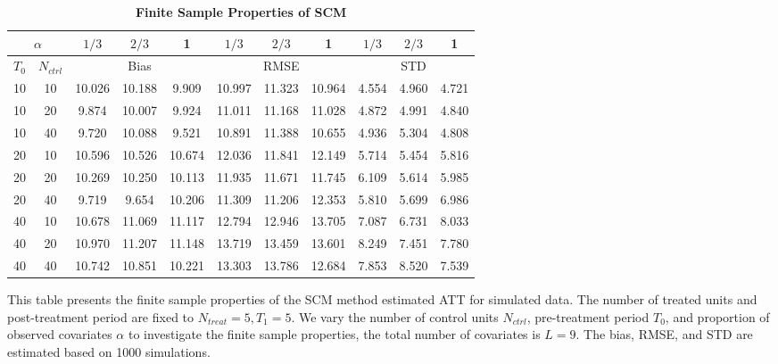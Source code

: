 \documentclass[12pt]{article}
\begin{document}
\begin{table}[!ht]
    \centering
    \caption{\textbf{Finite Sample Properties of SCM}}
    \begin{tabular}{cc|ccc|ccc|ccc}
    \toprule
    \multicolumn{2}{c|}{$\alpha$} & $1/3$ & $2/3$ & 1 & $1/3$ & $2/3$ & 1 & $1/3$ & $2/3$ & 1 \\
    \hline
    $T_0$ & $N_{ctrl}$ & \multicolumn{3}{c|}{Bias} & \multicolumn{3}{c|}{RMSE}  & \multicolumn{3}{c}{STD} \\
    \hline
    10 & 10 & 10.026 & 10.188 & 9.909 & 10.997 & 11.323 & 10.964 & 4.554 & 4.960 & 4.721 \\
    10 & 20 & 9.874 & 10.007 & 9.924 & 11.011 & 11.168 & 11.028 & 4.872 & 4.991 & 4.840 \\
    10 & 40 & 9.720 & 10.088 & 9.521 & 10.891 & 11.388 & 10.655 & 4.936 & 5.304 & 4.808 \\
\cline{1-11}
    20 & 10 & 10.596 & 10.526 & 10.674 & 12.036 & 11.841 & 12.149 & 5.714 & 5.454 & 5.816 \\
    20 & 20 & 10.269 & 10.250 & 10.113 & 11.935 & 11.671 & 11.745 & 6.109 & 5.614 & 5.985 \\
    20 & 40 & 9.719 & 9.654 & 10.206 & 11.309 & 11.206 & 12.353 & 5.810 & 5.699 & 6.986 \\
\cline{1-11}
    40 & 10 & 10.678 & 11.069 & 11.117 & 12.794 & 12.946 & 13.705 & 7.087 & 6.731 & 8.033 \\
    40 & 20 & 10.970 & 11.207 & 11.148 & 13.719 & 13.459 & 13.601 & 8.249 & 7.451 & 7.780 \\
    40 & 40 & 10.742 & 10.851 & 10.221 & 13.303 & 13.786 & 12.684 & 7.853 & 8.520 & 7.539 \\
    \bottomrule
    \end{tabular}
    \begin{tablenotes}
        \item This table presents the finite sample properties of the SCM method estimated ATT for simulated data. The number of treated units and post-treatment period are fixed to $N_{treat} = 5, T_1=5$. We vary the number of control units $N_{ctrl}$, pre-treatment period $T_0$, and proportion of observed covariates $\alpha$ to investigate the finite sample properties, the total number of covariates is $L=9$. The bias, RMSE, and STD are estimated based on 1000 simulations.
    \end{tablenotes}
    \end{table}
    
\end{document}
